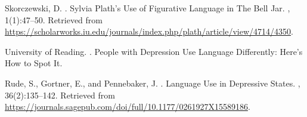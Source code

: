 \documentclass[11pt]{article}
\begin{document}
\begin{thebibliography}{}
Skorczewski, D.
.
\newblock Sylvia Plath’s Use of Figurative Language in The Bell Jar.
, 1(1):47--50.
\newblock Retrieved from \url{https://scholarworks.iu.edu/journals/index.php/plath/article/view/4714/4350}.

University of Reading.
.
\newblock People with Depression Use Language Differently: Here’s How to Spot It.

Rude, S., Gortner, E., and Pennebaker, J.
.
\newblock Language Use in Depressive States.
, 36(2):135--142.
\newblock Retrieved from \url{https://journals.sagepub.com/doi/full/10.1177/0261927X15589186}.

\end{thebibliography}
\end{document}

